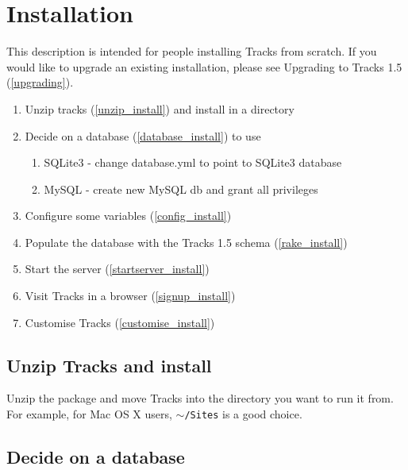 \documentclass[10pt,twoside]{memoir}
\begin{document}
\section{Installation}
\label{installation}

This description is intended for people installing Tracks from scratch. If you would like to upgrade an existing installation, please see Upgrading to Tracks 1.5 (\autoref{upgrading}).


\begin{enumerate}


\item Unzip tracks (\autoref{unzip_install}) and install in a directory

\item Decide on a database (\autoref{database_install}) to use
\begin{enumerate}


\item SQLite3 - change database.yml to point to SQLite3 database

\item MySQL - create new MySQL db and grant all privileges 
\end{enumerate}



\item Configure some variables (\autoref{config_install})

\item Populate the database with the Tracks 1.5 schema (\autoref{rake_install})

\item Start the server (\autoref{startserver_install})

\item Visit Tracks in a browser (\autoref{signup_install})

\item Customise Tracks (\autoref{customise_install})
\end{enumerate}

\subsection{Unzip Tracks and install}
\label{unzip_install}

Unzip the package and move Tracks into the directory you want to run it from. For example, for Mac OS X users, \texttt{\ensuremath{\sim}/Sites} is a good choice.


\subsection{Decide on a database}
\label{database_install}
\end{document}
